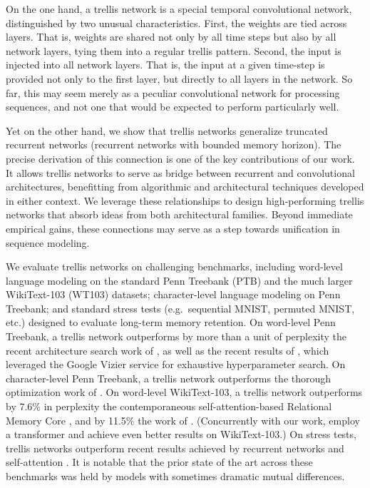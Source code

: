 \documentclass{article} \usepackage{iclr2019_conference,times}
\begin{document}
On the one hand, a trellis network is a special temporal convolutional network, distinguished by two unusual characteristics. First, the weights are tied across layers. That is, weights are shared not only by all time steps but also by all network layers, tying them into a regular trellis pattern. Second, the input is injected into all network layers. That is, the input at a given time-step is provided not only to the first layer, but directly to all layers in the network. So far, this may seem merely as a peculiar convolutional network for processing sequences, and not one that would be expected to perform particularly well.

Yet on the other hand, we show that trellis networks generalize truncated recurrent networks (recurrent networks with bounded memory horizon). The precise derivation of this connection is one of the key contributions of our work. It allows trellis networks to serve as bridge between recurrent and convolutional architectures, benefitting from algorithmic and architectural techniques developed in either context. We leverage these relationships to design high-performing trellis networks that absorb ideas from both architectural families. Beyond immediate empirical gains, these connections may serve as a step towards unification in sequence modeling.

We evaluate trellis networks on challenging benchmarks, including word-level language modeling on the standard Penn Treebank (PTB) and the much larger WikiText-103 (WT103) datasets; character-level language modeling on Penn Treebank; and standard stress tests (e.g.\ sequential MNIST, permuted MNIST, etc.) designed to evaluate long-term memory retention. On word-level Penn Treebank, a trellis network outperforms by more than a unit of perplexity the recent architecture search work of \cite{pham2018efficient}, as well as the recent results of \cite{Melis2018}, which leveraged the Google Vizier service for exhaustive hyperparameter search. On character-level Penn Treebank, a trellis network outperforms the thorough optimization work of \cite{merity2018analysis}. On word-level WikiText-103, a trellis network outperforms by 7.6\% in perplexity the contemporaneous self-attention-based Relational Memory Core \citep{santoro2018relational}, and by 11.5\% the work of \cite{merity2018analysis}. (Concurrently with our work, \cite{dai2018transformer} employ a transformer and achieve even better results on WikiText-103.) On stress tests, trellis networks outperform recent results achieved by recurrent networks and self-attention \citep{trinh2018learning}. It is notable that the prior state of the art across these benchmarks was held by models with sometimes dramatic mutual differences.
\end{document}
